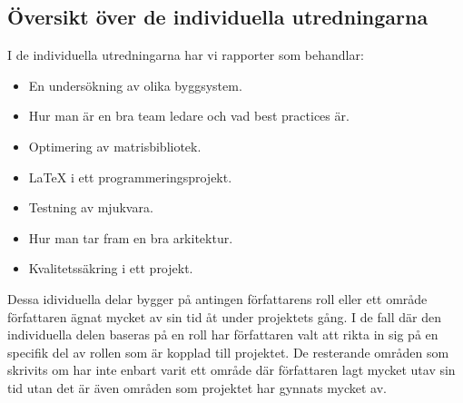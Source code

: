 \subsection{Översikt över de individuella utredningarna}
I de individuella utredningarna har vi rapporter som behandlar: 
\begin{itemize}
	\item En undersökning av olika byggsystem.
	\item Hur man är en bra team ledare och vad best practices är.
	\item Optimering av matrisbibliotek. 
	\item {\LaTeX} i ett programmeringsprojekt.
	\item Testning av mjukvara. 
	\item Hur man tar fram en bra arkitektur. 
	\item Kvalitetssäkring i ett projekt.  
\end{itemize}
Dessa idividuella delar bygger på antingen författarens roll eller ett område författaren ägnat mycket av sin tid åt under projektets gång. I de fall där den individuella delen baseras på en roll har författaren valt att rikta in sig på en specifik del av rollen som är kopplad till projektet. De resterande områden som skrivits om har inte enbart varit ett område där författaren lagt mycket utav sin tid utan det är även områden som projektet har gynnats mycket av.
